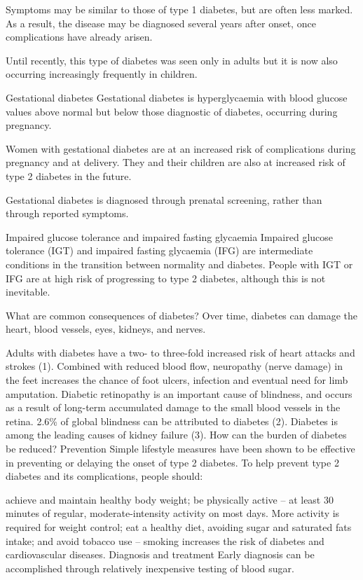 \documentclass[12pt]{article}
\begin{document}
Symptoms may be similar to those of type 1 diabetes, but are often less marked. As a result, the disease may be diagnosed several years after onset, once complications have already arisen.

Until recently, this type of diabetes was seen only in adults but it is now also occurring increasingly frequently in children.

Gestational diabetes
Gestational diabetes is hyperglycaemia with blood glucose values above normal but below those diagnostic of diabetes, occurring during pregnancy.

Women with gestational diabetes are at an increased risk of complications during pregnancy and at delivery. They and their children are also at increased risk of type 2 diabetes in the future.

Gestational diabetes is diagnosed through prenatal screening, rather than through reported symptoms.

Impaired glucose tolerance and impaired fasting glycaemia
Impaired glucose tolerance (IGT) and impaired fasting glycaemia (IFG) are intermediate conditions in the transition between normality and diabetes. People with IGT or IFG are at high risk of progressing to type 2 diabetes, although this is not inevitable.

What are common consequences of diabetes?
Over time, diabetes can damage the heart, blood vessels, eyes, kidneys, and nerves.

Adults with diabetes have a two- to three-fold increased risk of heart attacks and strokes (1).
Combined with reduced blood flow, neuropathy (nerve damage) in the feet increases the chance of foot ulcers, infection and eventual need for limb amputation.
Diabetic retinopathy is an important cause of blindness, and occurs as a result of long-term accumulated damage to the small blood vessels in the retina. 2.6\% of global blindness can be attributed to diabetes (2).
Diabetes is among the leading causes of kidney failure (3).
How can the burden of diabetes be reduced?
Prevention
Simple lifestyle measures have been shown to be effective in preventing or delaying the onset of type 2 diabetes. To help prevent type 2 diabetes and its complications, people should:

achieve and maintain healthy body weight;
be physically active – at least 30 minutes of regular, moderate-intensity activity on most days. More activity is required for weight control;
eat a healthy diet, avoiding sugar and saturated fats intake; and
avoid tobacco use – smoking increases the risk of diabetes and cardiovascular diseases.
Diagnosis and treatment
Early diagnosis can be accomplished through relatively inexpensive testing of blood sugar.
\end{document}
